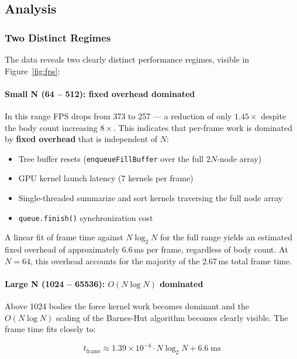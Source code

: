 \documentclass[12pt]{article}
\begin{document}
    \subsection{Analysis}

    \subsubsection{Two Distinct Regimes}

    The data reveals two clearly distinct performance regimes, visible in
    Figure~\ref{fig:fps}:

\paragraph{Small N (64 -- 512): fixed overhead dominated}

In this range FPS drops from 373 to 257 --- a reduction of only $1.45\times$
despite the body count increasing $8\times$. This indicates that per-frame
work is dominated by \textbf{fixed overhead} that is independent of $N$:

\begin{itemize}
    \item Tree buffer resets (\texttt{enqueueFillBuffer} over the full
          $2N$-node array)
    \item GPU kernel launch latency (7 kernels per frame)
    \item Single-threaded summarize and sort kernels traversing the
          full node array
    \item \texttt{queue.finish()} synchronization cost
\end{itemize}

A linear fit of frame time against $N \log_2 N$ for the full range
yields an estimated fixed overhead of approximately $\mathbf{6.6}$\,ms
per frame, regardless of body count. At $N = 64$, this overhead accounts
for the majority of the 2.67\,ms total frame time.

\paragraph{Large N (1024 -- 65536): $O(N \log N)$ dominated}

Above 1024 bodies the force kernel work becomes dominant and the
$O(N \log N)$ scaling of the Barnes-Hut algorithm becomes clearly visible.
The frame time fits closely to:

\[
t_{\text{frame}} \approx 1.39 \times 10^{-4} \cdot N \log_2 N + 6.6 \;\text{ms}
\]
\end{document}
